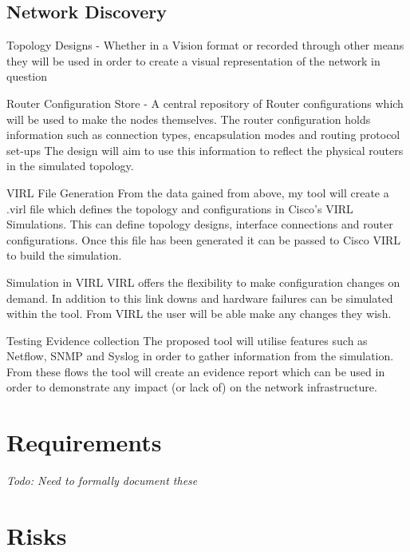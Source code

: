 \documentclass[11pt]{report}
\begin{document}
\subsection{Network Discovery}

 

Topology Designs - Whether in a Vision format or recorded through other means they will be used in order to create a visual representation of the network in question

Router Configuration Store - A central repository of Router configurations which will be used to make the nodes themselves. The router configuration holds information such as connection types, encapsulation modes and routing protocol set-ups The design will aim to use this information to reflect the physical routers in the simulated topology.
      
VIRL File Generation
From the data gained from above, my tool will create a .virl file which defines the topology and configurations in Cisco’s VIRL Simulations. This can define topology designs, interface connections and router configurations. Once this file has been generated it can be passed to Cisco VIRL to build the simulation.

Simulation in VIRL
VIRL offers the flexibility to make configuration changes on demand. In addition to this link downs and hardware failures can be simulated within the tool. From VIRL the user will be able make any changes they wish.

Testing Evidence collection
The proposed tool will utilise features such as Netflow, SNMP and Syslog in order to gather information from the simulation. From these flows the tool will create an evidence report which can be used in order to demonstrate any impact (or lack of) on the network infrastructure.

\section{Requirements}

\textit{Todo: Need to formally document these}

\section{Risks}
\end{document}
